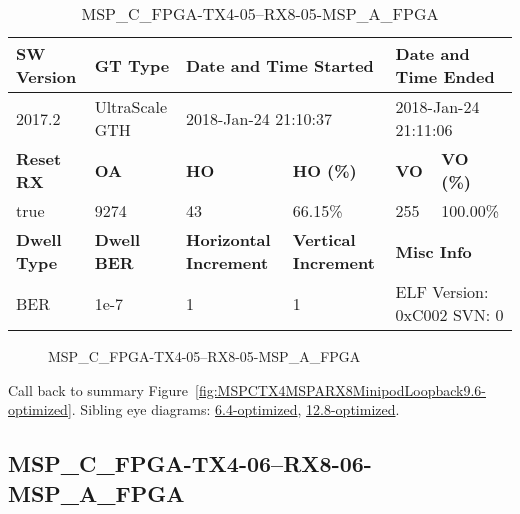 \begin{table}[h]
\centering
\caption{MSP\_C\_FPGA-TX4-05--RX8-05-MSP\_A\_FPGA}
\label{tab:MSPCFPGATX405RX805MSPAFPGA9.6-optimized}
\begin{tabular}{@{}|l|l|l|l|l|l|@{}}
\toprule
\textbf{SW Version}                & \textbf{GT Type}   & \multicolumn{2}{l|}{\textbf{Date and Time Started}}            & \multicolumn{2}{l|}{\textbf{Date and Time Ended}}        \\ \midrule
2017.2                       & UltraScale GTH          & \multicolumn{2}{l|}{2018-Jan-24 21:10:37}                   & \multicolumn{2}{l|}{2018-Jan-24 21:11:06}               \\ \midrule
\textbf{Reset RX}                  & \textbf{OA} & \textbf{HO}   & \textbf{HO (\%)} & \textbf{VO} & \textbf{VO (\%)} \\ \midrule
true & 9274        & 43          & 66.15\%        & 255        & 100.00\%       \\ \midrule
\textbf{Dwell Type}                & \textbf{Dwell BER} & \textbf{Horizontal Increment} & \textbf{Vertical Increment}    & \multicolumn{2}{l|}{\textbf{Misc Info}}                  \\ \midrule
BER                            & 1e-7        & 1        & 1           & \multicolumn{2}{l|}{ELF Version: 0xC002 SVN: 0}                         \\ \bottomrule
\end{tabular}
\end{table}

\begin{figure}[h]
\caption{MSP\_C\_FPGA-TX4-05--RX8-05-MSP\_A\_FPGA} \label{fig:MSPCFPGATX405RX805MSPAFPGA9.6-optimized}
\end{figure}

Call back to summary Figure~\ref{fig:MSPCTX4MSPARX8MinipodLoopback9.6-optimized}.
Sibling eye diagrams: \hyperref[sec:MSPCFPGATX405RX805MSPAFPGA6.4-optimized]{6.4-optimized}, \hyperref[sec:MSPCFPGATX405RX805MSPAFPGA12.8-optimized]{12.8-optimized}.

\clearpage
\newpage


\subsection{MSP\_C\_FPGA-TX4-06--RX8-06-MSP\_A\_FPGA}\label{sec:MSPCFPGATX406RX806MSPAFPGA9.6-optimized}

